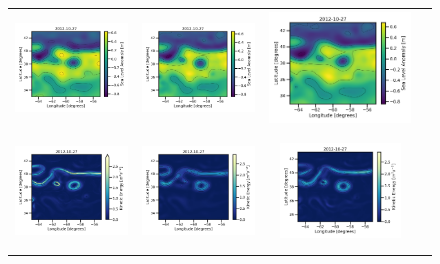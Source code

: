 \begin{figure}[t!]
\begin{center}
\begin{tabular}{cccc}
\includegraphics[trim={0 0 42mm 0},clip, width=3.2cm,height=3cm]{00_Oceanbench/content/figures/maps/sla/dc20a_miost_sla.png} &
\includegraphics[trim={0 0 42mm 0},clip, width=3.2cm,height=3cm]{00_Oceanbench/content/figures/maps/sla/dc20a_bfnqg_sla.png} &
\includegraphics[width=4.0cm,height=3cm]{00_Oceanbench/content/figures/maps/sla/dc20a_4dvarnet_sla.png} \\
\vspace{-2mm}
\includegraphics[trim={0 0 42mm 0},clip, width=3.20cm,height=3cm]{00_Oceanbench/content/figures/maps/ke/dc20a/nadir4/dc20a_nemo_ke.png} &
\includegraphics[trim={0 0 42mm 0},clip, width=3.2cm,height=3cm]{00_Oceanbench/content/figures/maps/ke/dc20a/nadir4/dc20a_miost_ke.png} &
\includegraphics[trim={0 0 42mm 0},clip, width=3.2cm,height=3cm]{00_Oceanbench/content/figures/maps/ke/dc20a/nadir4/dc20a_bfnqg_ke.png} &

\end{tabular}
\end{center}
\end{figure}
